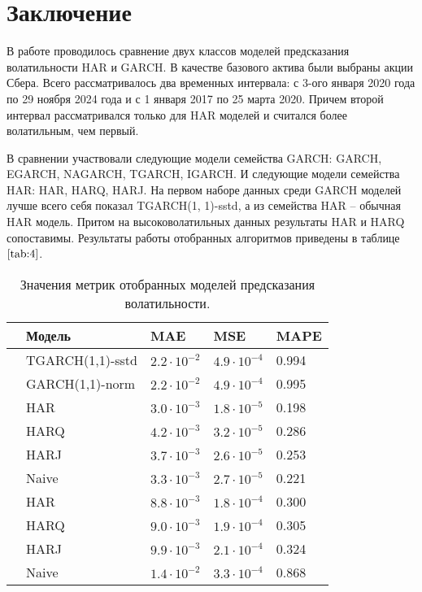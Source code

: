 \documentclass[]{article}
\begin{document}
\section{Заключение}

В работе проводилось сравнение двух классов моделей предсказания волатильности HAR и GARCH. В качестве базового актива были выбраны акции Сбера. Всего рассматривалось два временных интервала: с 3-ого января 2020 года по 29 ноября 2024 года и с 1 января 2017 по 25 марта 2020. Причем второй интервал рассматривался только для HAR моделей и считался более волатильным, чем первый.

В сравнении участвовали следующие модели семейства GARCH: GARCH, EGARCH, NAGARCH, TGARCH, IGARCH. И следующие модели семейства HAR: HAR, HARQ, HARJ.
На первом наборе данных среди GARCH моделей лучше всего себя показал TGARCH(1, 1)-sstd, а из семейства HAR -- обычная HAR модель. Притом на высоковолатильных данных результаты HAR и HARQ сопоставимы. Результаты работы отобранных алгоритмов приведены в таблице $\ref{tab:4}$.

\begin{table}[h!]
	\centering
	\caption{Значения метрик отобранных моделей предсказания волатильности.}
	\begin{tabularx}{\textwidth}{|X|X|X|X|l|}
		\hline
								  & Модель           &   MAE   & MSE     & MAPE     \\ \hline
		                          & TGARCH(1,1)-sstd & $2.2\cdot10^{-2}$ & $4.9\cdot10^{-4}$  & 0.994    \\ \cline{2-5}
		\centering{Период}        & GARCH(1,1)-norm  & $2.2\cdot10^{-2}$ & $4.9\cdot10^{-4}$  & 0.995    \\ \cline{2-5}
    	\centering{c 03-01-2020}  & HAR              & $3.0\cdot10^{-3}$ & $1.8\cdot10^{-5}$  & 0.198    \\ \cline{2-5}
    	\centering{по 29-11-2024} & HARQ             & $4.2\cdot10^{-3}$ & $3.2\cdot10^{-5}$  & 0.286    \\ \cline{2-5}
    	                          & HARJ             & $3.7\cdot10^{-3}$ & $2.6\cdot10^{-5}$  & 0.253    \\ \cline{2-5}
    	                          & Naive            & $3.3\cdot10^{-3}$ & $2.7\cdot10^{-5}$  & 0.221    \\ \hline
		\centering{Период}        & HAR              & $8.8\cdot10^{-3}$ & $1.8\cdot10^{-4}$  & 0.300    \\ \cline{2-5}
		\centering{c 01-01-2017}  & HARQ             & $9.0\cdot10^{-3}$ & $1.9\cdot10^{-4}$  & 0.305    \\ \cline{2-5}
		\centering{по 25-03-2020} & HARJ             & $9.9\cdot10^{-3}$ & $2.1\cdot10^{-4}$  & 0.324    \\ \cline{2-5}
		                   & Naive            & $1.4\cdot10^{-2}$ & $3.3\cdot10^{-4}$  & 0.868    \\ \cline{2-5}
		\hline
	\end{tabularx}
	\label{tab:4}
\end{table}
\end{document}
